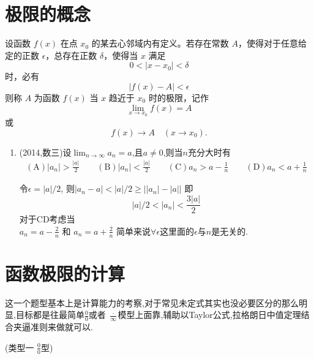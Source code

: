 \documentclass[12pt, a4paper, oneside, UTF8]{ctexbook}
\begin{document}
\section{极限的概念}
\begin{definition}[函数极限的定义]
    设函数 $f(x)$ 在点 $x_0$ 的某去心邻域内有定义。若存在常数 $A$，使得对于任意给定的正数 $\epsilon$，总存在正数 $\delta$，使得当 $x$ 满足
    \[
    0 < |x - x_0| < \delta
    \]
    时，必有
    \[
    |f(x) - A| < \epsilon
    \]
    则称 $A$ 为函数 $f(x)$ 当 $x$ 趋近于 $x_0$ 时的极限，记作
    \[
    \lim_{x \to x_0} f(x) = A
    \]
    或
    \[
    f(x) \to A \quad (x \to x_0).
    \]
\end{definition}
\begin{enumerate}[label=\arabic*.,start=3]
    \item  (2014,数三)设$\lim_{n\to\infty} a_n = a$,且$a \neq 0$,则当$n$充分大时有
    \begin{align*}
        (\text{A}) |a_n| > \frac{|a|}{2} \qquad
        (\text{B}) |a_n| < \frac{|a|}{2} \qquad
        (\text{C}) a_n > a - \frac{1}{n} \qquad
        (\text{D}) a_n < a + \frac{1}{n}
    \end{align*}
    
    \begin{solution}
    令$\epsilon = \left|a\right|/2$, 则$\left|a_n-a\right|< |a|/2 \geq \left| |a_n| - |a|\right|$ 
    即
    $$
        |a|/2 < |a_n| < \frac{ 3|a| }{2}
    $$
    对于CD考虑当 \\
    $a_n=a-\frac{2}{n}$ 和 $a_n=a+\frac{2}{n}$ 简单来说$\forall\epsilon$这里面的$\epsilon$与$n$是无关的.
    \end{solution}
\end{enumerate}

\section{函数极限的计算}
这一个题型基本上是计算能力的考察,对于常见未定式其实也没必要区分的那么明显,目标都是往最简单$\frac{0}{0}$或者
$\frac{\cdot}{\infty}$模型上面靠,辅助以Taylor公式,拉格朗日中值定理结合夹逼准则来做就可以.
\begin{remark}(类型一 $\frac{0}{0}$型)
\end{remark}
\end{document}
